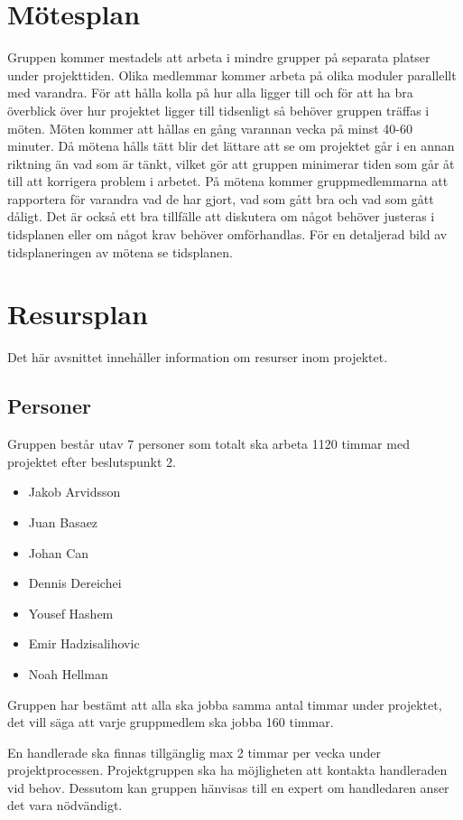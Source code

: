 \documentclass[projektplan/plan.tex]{subfiles}
\begin{document}
\section{Mötesplan}
Gruppen kommer mestadels att arbeta i mindre grupper på separata platser under
projekttiden. Olika medlemmar kommer arbeta på olika moduler parallellt med
varandra. För att hålla kolla på hur alla ligger till och för att ha bra
överblick över hur projektet ligger till tidsenligt så behöver gruppen träffas
i möten. Möten kommer att hållas en gång varannan vecka på minst 40-60 minuter.
Då mötena hålls tätt blir det lättare att se om projektet går i en annan
riktning än vad som är tänkt, vilket gör att gruppen minimerar tiden som går åt
till att korrigera problem i arbetet. På mötena kommer gruppmedlemmarna att rapportera
för varandra vad de har gjort, vad som gått bra och vad som gått dåligt. Det är
också ett bra tillfälle att diskutera om något behöver justeras i tidsplanen
eller om något krav behöver omförhandlas. För en detaljerad bild av
tidsplaneringen av mötena se tidsplanen.

\section{Resursplan}
Det här avsnittet innehåller information om resurser inom projektet.

\subsection{Personer}
Gruppen består utav 7 personer som totalt ska arbeta 1120 timmar med projektet
efter beslutspunkt 2.

\begin{itemize}
    \item Jakob Arvidsson
    \item Juan Basaez
    \item Johan Can
    \item Dennis Dereichei
    \item Yousef Hashem
    \item Emir Hadzisalihovic
    \item Noah Hellman

\end{itemize}
Gruppen har bestämt att alla ska jobba samma antal timmar under projektet, det
vill säga att varje gruppmedlem ska jobba 160 timmar.

En handlerade ska finnas tillgänglig max 2 timmar per vecka under projektprocessen.
Projektgruppen ska ha möjligheten att kontakta handleraden vid behov.
Dessutom kan gruppen hänvisas till en expert om handledaren anser det vara
nödvändigt.
\end{document}
